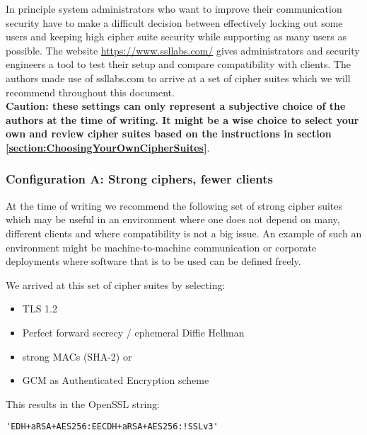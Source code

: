 
In principle system administrators who want to improve their communication security
have to make a difficult decision between effectively locking out some users and 
keeping high cipher suite security while supporting as many users as possible.
The website \url{https://www.ssllabs.com/} gives administrators and security engineers
a tool to test their setup and compare compatibility with clients. The authors made 
use of ssllabs.com to arrive at a set of cipher suites which we will recommend 
throughout this document.\\

\textbf{Caution: these settings can only represent a subjective
choice of the authors at the time of writing. It might be a wise choice to
select your own and review cipher suites based on the instructions in section
\ref{section:ChoosingYourOwnCipherSuites}}.


\subsubsection{Configuration A: Strong ciphers, fewer clients}

At the time of writing we recommend the following set of strong cipher
suites which may be useful in an environment where one does not depend on many,
different clients and where compatibility is not a big issue.  An example
of such an environment might be machine-to-machine communication or corporate
deployments where software that is to be used can be defined freely.


We arrived at this set of cipher suites by selecting:

\begin{itemize}
\item TLS 1.2
\item Perfect forward secrecy / ephemeral Diffie Hellman
\item strong MACs (SHA-2) or
\item GCM as Authenticated Encryption scheme
\end{itemize}

This results in the OpenSSL string:

\begin{lstlisting}[breaklines]
'EDH+aRSA+AES256:EECDH+aRSA+AES256:!SSLv3'
\end{lstlisting}

